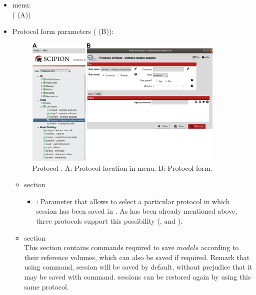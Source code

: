  \begin{itemize}
  \item \scipion menu:\\
    ( (A))\\
  
  \item Protocol form parameters ( (B)):\\
  
    \begin{figure}[H]
     \centering 
     \captionsetup{width=.7\linewidth} 
     \includegraphics[width=0.90\textwidth]{Images_appendix/Fig118.pdf}
     \caption{Protocol . A: Protocol location in \scipion menu. B: Protocol form.}
     \label{fig:app_protocol_chimera_3}
    \end{figure}
    
    \begin{itemize}
     \item {} section\\

    \begin{itemize}
     \item {}: Parameter that allows to select a particular protocol in which \chimera session has been saved in \scipion. As has been already mentioned above, three protocols support this possibility (,  and ).\\
     
    \end{itemize}
    \item {} section\\
    This section contains \chimera commands required to save $models$ according to their reference volumes, which can also be saved if required. Remark that using  command, \chimera session will be saved by default, without prejudice that it may be saved with  command. \chimera sessions can be restored again by using this same  protocol.\\
    

\end{itemize}
\end{itemize}
